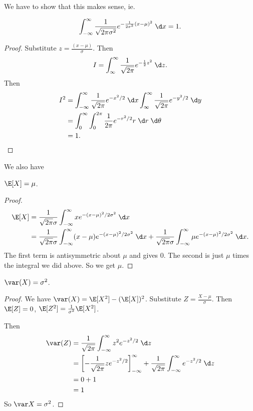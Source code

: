 \documentclass[a4paper]{article}
\begin{document}
We have to show that this makes sense, ie.
\begin{prop}
  \[
    \int_{-\infty}^\infty \frac{1}{\sqrt{2\pi \sigma^2}} e^{-\frac{1}{2\sigma^2}(x - \mu)^2}\;\d x = 1.
  \]
\end{prop}
\begin{proof}
  Substitute $z = \frac{(x - \mu)}{\sigma}$. Then
  \[
    I = \int_{\infty}^\infty \frac{1}{\sqrt{2\pi}}e^{-\frac{1}{2}z^2}\;\d z.
  \]
  Then
  \begin{align*}
    I^2 &= \int_{-\infty}^\infty \frac{1}{\sqrt{2\pi}} e^{-x^2/2}\;\d x\int_{\infty}^\infty \frac{1}{\sqrt{2\pi}} e^{-y^2/2}\;\d y\\
    &= \int_0^\infty \int_0^{2\pi}\frac{1}{2\pi}e^{-r^2/2}r\;\d r\;\d \theta\\
    &= 1.
  \end{align*}
\end{proof}

We also have
\begin{prop}
  $\E[X] = \mu$.
\end{prop}
\begin{proof}
\begin{align*}
  \E[X] &= \frac{1}{\sqrt{2\pi}\sigma} \int_{-\infty}^\infty x e^{-(x - \mu)^2/2\sigma^2}\;\d x\\
  &= \frac{1}{\sqrt{2\pi} \sigma}\int_{-\infty}^\infty (x - \mu)e^{-(x - \mu)^2/2\sigma^2}\;\d x + \frac{1}{\sqrt{2\pi}\sigma}\int_{-\infty}^\infty \mu e^{-(x - \mu)^2/2\sigma^2}\;\d x.
\end{align*}
The first term is antisymmetric about $\mu$ and gives $0$. The second is just $\mu$ times the integral we did above. So we get $\mu$.
\end{proof}

\begin{prop}
  $\var(X) = \sigma^2$.
\end{prop}

\begin{proof}
  We have $\var (X) = \E[X^2] - (\E[X])^2$. Substitute $Z = \frac{X - \mu}{\sigma}$. Then $\E[Z] = 0$, $\E[Z^2] = \frac{1}{\sigma^2}\E[X^2]$.

  Then
  \begin{align*}
    \var(Z) &= \frac{1}{\sqrt{2\pi}}  \int_{-\infty}^\infty z^2 e^{-z^2/2}\;\d z\\
    &= \left[-\frac{1}{\sqrt{2\pi}}ze^{-z^2/2}\right]_{-\infty}^\infty + \frac{1}{\sqrt{2\pi}}\int_{-\infty}^\infty e^{-z^2/2}\;\d z\\
    &= 0 + 1\\
    &= 1
  \end{align*}
  So $\var X = \sigma^2$.
\end{proof}
\end{document}
